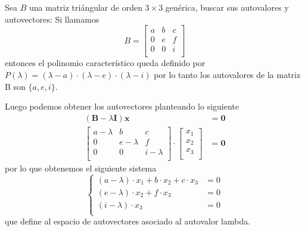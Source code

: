 \begin{example}[]
    Sea $B$ una matriz triángular de orden $3\times 3$ genérica, buscar sus
    autovalores y autovectores:
    \vspace*{5pt}
    Si llamamos
    \begin{equation*}
        B = 
        \begin{bmatrix}
        a & b & c\\
        0 & e & f\\
        0 & 0 & i\\
        \end{bmatrix}
    \end{equation*}
    entonces el polinomio característico queda definido por 
    $P(\lambda) = (\lambda - a)\cdot (\lambda - e) \cdot (\lambda - i)$ por lo tanto
    los autovalores de la matriz B son $\{a, e, i\}$.

    Luego podemos obtener los autovectores planteando lo siguiente
    \begin{equation*}
        \begin{split}
            (\bm{B} - \lambda \bm{I}) \bm{x} &= \bm{0} \\
            \begin{bmatrix}
            a-\lambda & b & c\\
            0 & e-\lambda & f\\
            0 & 0 & i-\lambda\\
            \end{bmatrix} \cdot
            \begin{bmatrix}
            x_1\\
            x_2\\
            x_3\\
            \end{bmatrix} &= \bm{0}
        \end{split}
    \end{equation*}
    por lo que obtenemos el siguiente sistema
    \begin{equation}
        \begin{cases}
            (a-\lambda)\cdot x_1 + b\cdot x_2 + c \cdot x_3 &= 0\\
            (e-\lambda)\cdot x_2 + f \cdot x_3 &= 0\\
            (i-\lambda)\cdot x_3 &=0 \\
        \end{cases}
    \end{equation}
    que define al espacio de autovectores asociado al autovalor lambda.

\end{example}

